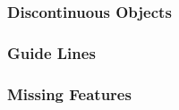 			

			\subsubsection{Discontinuous Objects}%
			\label{sssec:discont_objects}

			\subsubsection{Guide Lines}%
			\label{sssec:guide_lines}

			\subsubsection{Missing Features}%
			\label{sssec:missing_todo}

